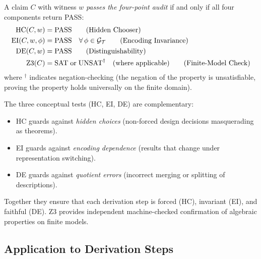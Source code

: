\begin{definition}
\label{def:four-point}
A claim $C$ with witness $w$ \emph{passes the four-point audit} if and
only if all four components return PASS:
\begin{align}
  \mathrm{HC}(C, w) &= \mathrm{PASS}
    \tag{Hidden Chooser} \label{eq:audit-hc} \\
  \mathrm{EI}(C, w, \phi) &= \mathrm{PASS}
    \quad \forall\, \phi \in \mathcal{G}_{\mathcal{T}}
    \tag{Encoding Invariance} \label{eq:audit-ei} \\
  \mathrm{DE}(C, w) &= \mathrm{PASS}
    \tag{Distinguishability} \label{eq:audit-de} \\
  \mathrm{Z3}(C) &= \mathrm{SAT} \;\text{or}\; \mathrm{UNSAT}^\dag
    \quad \text{(where applicable)}
    \tag{Finite-Model Check} \label{eq:audit-z3}
\end{align}
where $^\dag$ indicates negation-checking (the negation of the property
is unsatisfiable, proving the property holds universally on the finite
domain).
\end{definition}

\begin{remark}
The three conceptual tests (HC, EI, DE) are complementary:
\begin{itemize}[nosep]
  \item HC guards against \emph{hidden choices} (non-forced design
        decisions masquerading as theorems).
  \item EI guards against \emph{encoding dependence} (results that change
        under representation switching).
  \item DE guards against \emph{quotient errors} (incorrect merging or
        splitting of descriptions).
\end{itemize}
Together they ensure that each derivation step is forced (HC), invariant
(EI), and faithful (DE).  Z3 provides independent machine-checked
confirmation of algebraic properties on finite models.
\end{remark}

\subsection{Application to Derivation Steps}


